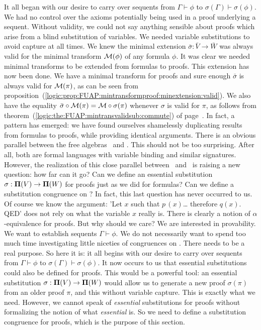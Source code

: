 It all began with our desire to carry over sequents from
$\Gamma\vdash\phi$ to $\sigma(\Gamma)\vdash\sigma(\phi)$. We had no
control over the axioms potentially being used in a proof underlying
a sequent. Without validity, we could not say anything sensible
about proofs which arise from a blind substitution of variables. We
needed variable substitutions to avoid capture at all times. We knew
the minimal extension $\bar{\sigma}:\bar{V}\to\bar{W}$ was always
valid for the minimal transform ${\cal M}(\phi)$ of any formula
$\phi$. It was clear we needed minimal transforms to be extended
from formulas to proofs. This extension has now been done. We have a
minimal transform for proofs and sure enough $\bar{\sigma}$ is
always valid for ${\cal M}(\pi)$, as can be seen from
proposition~(\ref{logic:prop:FUAP:mintransformproof:minextension:valid}).
We also have the equality $\bar{\sigma}\circ{\cal M}(\pi)={\cal
M}\circ\sigma(\pi)$ whenever $\sigma$ is valid for $\pi$, as follows
from theorem~(\ref{logic:the:FUAP:mintransvalidsub:commute}) of
page~\pageref{logic:the:FUAP:mintransvalidsub:commute}. In fact, a
pattern has emerged: we have found ourselves shamelessly duplicating
results from formulas to proofs, while providing identical
arguments. There is an obvious parallel between the free algebras
\pv\ and \pvs. This should not be too surprising. After all, both
are formal languages with variable binding and similar signatures.
However, the realization of this close parallel between \pv\ and
\pvs\ is raising a new question: how far can it go? Can we define an
essential substitution $\sigma:\mbox{${\bf\Pi}(V)$}\to{\bf \Pi}(W)$ for proofs just
as we did for formulas? Can we define a substitution congruence on
\pvs? In fact, this last question has never occurred to us. Of
course we know the argument: 'Let $x$ such that $p\,(x)$\ldots
therefore $q(x)$. QED' does not rely on what the variable $x$ really
is. There is clearly a notion of $\alpha$-equivalence for proofs.
But why should we care? We are interested in provability. We want to
establish sequents $\Gamma\vdash\phi$. We do not necessarily want to
spend too much time investigating little niceties of congruences on
\pvs. There needs to be a real purpose. So here it is: it all begins
with our desire to carry over sequents from $\Gamma\vdash\phi$ to
$\sigma(\Gamma)\vdash\sigma(\phi)$. It now occurs to us that
essential substitutions could also be defined for proofs. This would
be a powerful tool: an essential substitution $\sigma:\mbox{${\bf\Pi}(V)$}\to{\bf
\Pi}(W)$ would allow us to generate a new proof $\sigma(\pi)$ from
an older proof $\pi$, and this without variable capture. This is
exactly what we need. However, we cannot speak of {\em essential}
substitutions for proofs without formalizing the notion of what {\em
essential} is. So we need to define a substitution congruence for
proofs, which is the purpose of this section.

